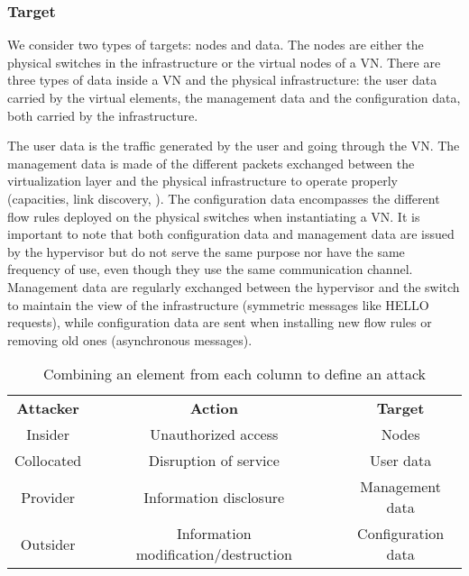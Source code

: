 \subsubsection{Target}
We consider two types of targets: nodes and data.
The nodes are either the physical switches in the infrastructure or the virtual nodes of a VN.
There are three types of data inside a VN and the physical infrastructure:
the user data carried by the virtual elements, the management data and the configuration data, both carried by the infrastructure. 

The user data is the traffic generated by the user and going through the VN.
The management data is made of the different packets exchanged between the virtualization layer and the physical infrastructure to operate properly (capacities, link discovery, \etc).
The configuration data encompasses the different flow rules deployed on the physical switches when instantiating a VN.
It is important to note that both configuration data and management data are issued by the hypervisor but do not serve the same purpose nor have the same frequency of use, even though they use the same communication channel.
Management data are regularly exchanged between the hypervisor and the switch to maintain the view of the infrastructure (\eg symmetric messages like HELLO requests), while configuration data are sent when installing new flow rules or removing old ones (asynchronous messages).

\begin{table}[ht]
\centering
\begin{tabular}{|c|c|c|c|c|}
\cline{1-1} \cline{3-3} \cline{5-5}
\textbf{Attacker} &  & \textbf{Action}                      &  & \textbf{Target}    \\ \cline{1-1} \cline{3-3} \cline{5-5} 
Insider           &  & Unauthorized access                  &  & Nodes              \\ \cline{1-1} \cline{3-3} \cline{5-5} 
Collocated        &  & Disruption of service                &  & User data          \\ \cline{1-1} \cline{3-3} \cline{5-5} 
Provider          &  & Information disclosure               &  & Management data    \\ \cline{1-1} \cline{3-3} \cline{5-5} 
Outsider          &  & Information modification/destruction &  & Configuration data \\ \cline{1-1} \cline{3-3} \cline{5-5} 
\end{tabular}%
\caption{Combining an element from each column to define an attack}
\label{tab:attack-model}
\end{table}

